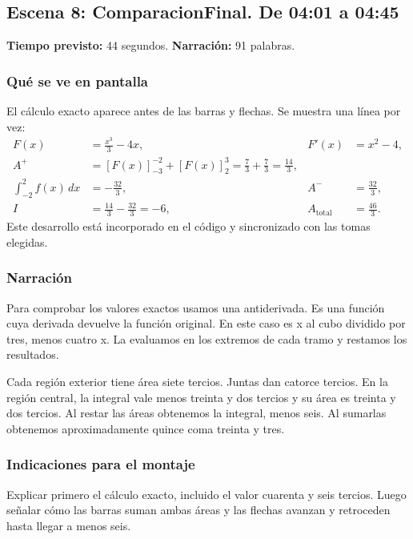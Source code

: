 \documentclass[11pt,a4paper]{article}
\newcommand{\escena}[4]{\textbf{Escena #1: #2.} De #3 a #4}
\begin{document}
\noindent\begin{minipage}[t]{\textwidth}
\subsection*{\escena{8}{ComparacionFinal}{04:01}{04:45}}

\textbf{Tiempo previsto:} 44 segundos. \textbf{Narración:} 91 palabras.

\subsubsection*{Qué se ve en pantalla}
El cálculo exacto aparece antes de las barras y flechas. Se muestra una línea por vez:
\[
\begin{aligned}
 F(x)&=\frac{x^3}{3}-4x, & F'(x)&=x^2-4,\\[4pt]
 A^+&=[F(x)]_{-3}^{-2}+[F(x)]_{2}^{3}
 =\frac{7}{3}+\frac{7}{3}=\frac{14}{3},\\[4pt]
 \int_{-2}^{2}f(x)\,dx&=-\frac{32}{3}, & A^-&=\frac{32}{3},\\[4pt]
 I&=\frac{14}{3}-\frac{32}{3}=-6, &
 A_{\mathrm{total}}&=\frac{46}{3}.
\end{aligned}
\]
Este desarrollo está incorporado en el código y sincronizado con las tomas elegidas.

\subsubsection*{Narración}
Para comprobar los valores exactos usamos una antiderivada. Es una función cuya derivada devuelve la función original. En este caso es x al cubo dividido por tres, menos cuatro x. La evaluamos en los extremos de cada tramo y restamos los resultados.

Cada región exterior tiene área siete tercios. Juntas dan catorce tercios. En la región central, la integral vale menos treinta y dos tercios y su área es treinta y dos tercios. Al restar las áreas obtenemos la integral, menos seis. Al sumarlas obtenemos aproximadamente quince coma treinta y tres.

\subsubsection*{Indicaciones para el montaje}
Explicar primero el cálculo exacto, incluido el valor cuarenta y seis tercios. Luego señalar cómo las barras suman ambas áreas y las flechas avanzan y retroceden hasta llegar a menos seis.
\end{minipage}\par\medskip
\end{document}
